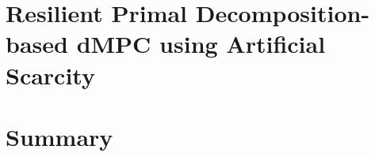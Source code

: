 \documentclass[aspectratio=169]{beamer}
\begin{document}


\section{Resilient Primal Decomposition-based dMPC using Artificial Scarcity}

\section*{Summary}
\end{document}
